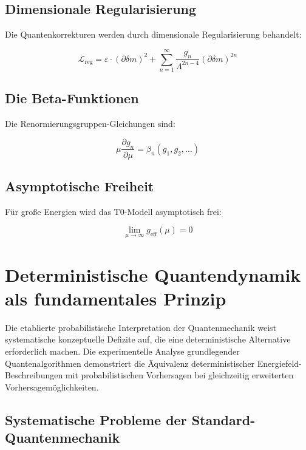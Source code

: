 \documentclass[12pt,a4paper]{report}
\begin{document}
	\subsection{Dimensionale Regularisierung}
	
	Die Quantenkorrekturen werden durch dimensionale Regularisierung behandelt:
	
	\begin{equation}
		\mathcal{L}_{\text{reg}} = \varepsilon \cdot (\partial\delta m)^2 + \sum_{n=1}^\infty \frac{g_n}{\Lambda^{2n-4}} (\partial\delta m)^{2n}
	\end{equation}
	
	\subsection{Die Beta-Funktionen}
	
	Die Renormierungsgruppen-Gleichungen sind:
	
	\begin{equation}
		\mu \frac{\partial g_n}{\partial \mu} = \beta_n(g_1, g_2, \ldots)
	\end{equation}
	
	\subsection{Asymptotische Freiheit}
	
	Für große Energien wird das T0-Modell asymptotisch frei:
	
	\begin{equation}
		\lim_{\mu \to \infty} g_{\text{eff}}(\mu) = 0
	\end{equation}
	\section{Deterministische Quantendynamik als fundamentales Prinzip}
	
	Die etablierte probabilistische Interpretation der Quantenmechanik weist systematische konzeptuelle Defizite auf, die eine deterministische Alternative erforderlich machen. Die experimentelle Analyse grundlegender Quantenalgorithmen demonstriert die Äquivalenz deterministischer Energiefeld-Beschreibungen mit probabilistischen Vorhersagen bei gleichzeitig erweiterten Vorhersagemöglichkeiten.
	
	\subsection{Systematische Probleme der Standard-Quantenmechanik}
	
\end{document}
